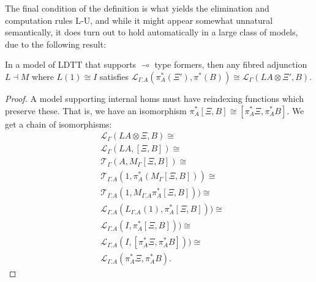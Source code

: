 \documentclass[a4paper,english]{lipics-v2018}
\begin{document}
The final condition of the definition is what yields the elimination and computation rules L-U, and while it might appear somewhat unnatural semantically, it does turn out to hold automatically in a large class of models, due to the following result:
\begin{theorem}In a model of LDTT that supports $\multimap$ type formers, then any fibred adjunction $L \dashv M$ where $L(1) \cong I$ satisfies $\mathcal{L}_{\Gamma.A}(\pi^*_A(\Xi'), \pi^*(B)) \cong \mathcal{L}_{\Gamma}(LA \otimes \Xi', B)$.
  \begin{proof}
    A model supporting internal homs must have reindexing functions which preserve these. That is, we have an isomorphism $\pi_A^*[\Xi, B] \cong [\pi_A^*\Xi, \pi^*_AB]$. We get a chain of isomorphisms:
\[
      \begin{split}
&        \mathcal{L}_{\Gamma}(LA \otimes \Xi, B) \cong \\
 &       \mathcal{L}_{\Gamma}(LA, [\Xi, B]) \cong \\
  &      \mathcal{T}_{\Gamma}(A, M_{\Gamma}[\Xi, B]) \cong \\
 &\mathcal{T}_{\Gamma.A}(1, \pi_A^*(M_{\Gamma}[\Xi, B])) \cong \\
 &\mathcal{T}_{\Gamma.A}(1, M_{\Gamma.A}\pi_A^*[\Xi, B])) \cong \\
  &\mathcal{L}_{\Gamma.A}(L_{\Gamma.A}(1), \pi_A^*[\Xi, B])) \cong \\
 &\mathcal{L}_{\Gamma.A}(I, \pi_A^*[\Xi, B])) \cong \\
 &\mathcal{L}_{\Gamma.A}(I, [\pi_A^*\Xi, \pi_A^*B])) \cong \\
 &\mathcal{L}_{\Gamma.A}(\pi_A^*\Xi, \pi_A^*B).
      \end{split}
\]
  \end{proof}
\end{theorem}
\end{document}
